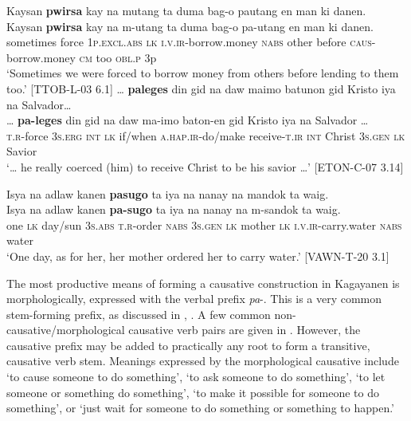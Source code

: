 \ea
\label{bkm:Ref501085964}
Kaysan  \textbf{pwirsa}  kay  na  mutang  ta  duma  bag-o pautang  en  man  ki  danen. \\\smallskip
\gll Kaysan  \textbf{pwirsa}  kay  na  m-utang  ta  duma  bag-o pa-utang\footnotemark{}  en  man  ki  danen. \\
sometimes  force  1\textsc{p.excl.abs}  \textsc{lk}  \textsc{i.v.ir}-borrow.money  \textsc{nabs}  other  before
\textsc{caus}-borrow.money  \textsc{cm}  too  \textsc{obl.p}  3p \\
\glt `Sometimes we were forced to borrow money from others before lending to them too.’ [TTOB-L-03 6.1]
\z
\ea
… \textbf{paleges}  din  gid  na  daw  maimo  batunon  gid Kristo  iya  na  Salvador… \\\smallskip
\gll … \textbf{pa-leges}  din  gid  na  daw  ma-imo  baton-en  gid Kristo  iya  na  Salvador … \\
 {} \textsc{t.r}-force  3\textsc{s.erg}  \textsc{int}  \textsc{lk}  if/when  \textsc{a.hap.ir}-do/make  receive-\textsc{t.ir}  \textsc{int} Christ  3\textsc{s.gen}  \textsc{lk}  Savior \\
\glt `… he really coerced (him) to receive Christ to  be his savior …’ [ETON-C-07 3.14]
\z

\ea
Isya  na  adlaw  kanen  \textbf{pasugo}  ta  iya  na  nanay  na mandok ta waig.\\\smallskip
\gll Isya  na  adlaw  kanen  \textbf{pa-sugo}  ta  iya  na  nanay  na m-sandok ta waig. \\
one  \textsc{lk}  day/sun  3\textsc{s.abs}  \textsc{t.r}-order  \textsc{nabs}  3\textsc{s.gen}  \textsc{lk}  mother  \textsc{lk}
\textsc{i.v.ir}-carry.water \textsc{nabs} water \\
\glt `One day, as for her, her mother ordered her to carry water.’ [VAWN-T-20 3.1]
\z

The most productive means of forming a causative construction in Kagayanen is morphologically, expressed with the verbal prefix \textit{pa}{}-. This is a very common stem-forming prefix, as discussed in , . A few common non-caus\-a\-tive{\slash}morphological causative verb pairs are given in . However, the causative prefix may be added to practically any root to form a transitive, causative verb stem. Meanings expressed by the morphological causative include ‘to cause someone to do something’, ‘to ask someone to do something’, ‘to let someone or something do something’, ‘to make it possible for someone to do something’, or ‘just wait for someone to do something or something to happen.’

